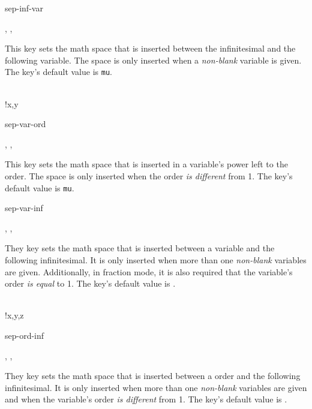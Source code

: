 \begin{option}{sep-inf-var}
	\begin{values}[default = 0]
		, , 
	\end{values}
	This key sets the math space that is inserted between the infinitesimal and the following variable. The space is only inserted when a \emph{non-blank} variable is given. The key's default value is  \texttt{mu}.
	\begin{example}
		 \\
		!{x,y}
	\end{example}
\end{option}

\begin{option}{sep-var-ord}
	\begin{values}[default = 0]
		, , \marg{delimiter}
	\end{values}
	This key sets the math space that is inserted in a variable's power left to the order. The space is only inserted when the order \emph{is different} from \num{1}. The key's default value is  \texttt{mu}.
	\begin{example}
		\pdv[sep-var-ord=\here, order=n]{f}{x,y}
	\end{example}
\end{option}

\begin{option}{sep-var-inf}
	\begin{values}[default = \cs{mathop}\{\}\cs{!}]
		, , 
	\end{values}
	They key sets the math space that is inserted between a variable and the following infinitesimal. It is only inserted when more than one \emph{non-blank} variables are given. Additionally, in fraction mode, it is also required that the variable's order \emph{is equal} to \num{1}. The key's default value is \val{\default}.
	\begin{example}
		\pdv[sep-var-inf=\here, order=n]{f}{x,y,z} \\
		!{x,y,z}
	\end{example}
\end{option}

\begin{option}{sep-ord-inf}
	\begin{values}[default = \cs{mathop}\{\}\cs{!}]
		, , 
	\end{values}
	They key sets the math space that is inserted between a order and the following infinitesimal. It is only inserted when more than one \emph{non-blank} variables are given and when the variable's order \emph{is different} from \num{1}. The key's default value is .
	\begin{example}
		\pdv[sep-ord-inf=\here, order=n]{f}{x,y,z}
	\end{example}
\end{option}

